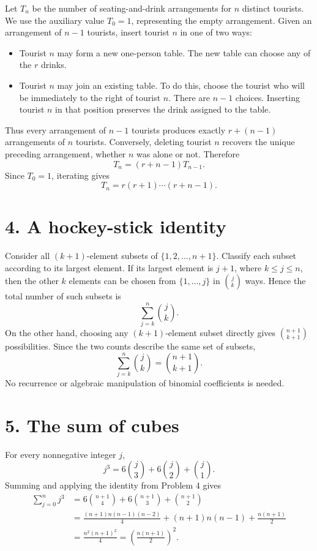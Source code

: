 \documentclass[11pt]{article}
\begin{document}
Let \(T_n\) be the number of seating-and-drink arrangements for \(n\)
distinct tourists. We use the auxiliary value \(T_0=1\), representing the
empty arrangement. Given an arrangement of \(n-1\) tourists, insert tourist
\(n\) in one of two ways:

\begin{itemize}[leftmargin=2em]
    \item Tourist \(n\) may form a new one-person table. The new table can
    choose any of the \(r\) drinks.
    \item Tourist \(n\) may join an existing table. To do this, choose the
    tourist who will be immediately to the right of tourist \(n\). There are
    \(n-1\) choices. Inserting tourist \(n\) in that position preserves the
    drink assigned to the table.
\end{itemize}

Thus every arrangement of \(n-1\) tourists produces exactly
\(r+(n-1)\) arrangements of \(n\) tourists. Conversely, deleting tourist
\(n\) recovers the unique preceding arrangement, whether \(n\) was alone or
not. Therefore
\[
    T_n=(r+n-1)T_{n-1}.
\]
Since \(T_0=1\), iterating gives
\[
    T_n=r(r+1)\cdots(r+n-1).
\]

\section*{4. A hockey-stick identity}

Consider all \((k+1)\)-element subsets of \(\{1,2,\ldots,n+1\}\). Classify
each subset according to its largest element. If its largest element is
\(j+1\), where \(k\leq j\leq n\), then the other \(k\) elements can be chosen
from \(\{1,\ldots,j\}\) in \(\binom{j}{k}\) ways. Hence the total number of
such subsets is
\[
    \sum_{j=k}^{n}\binom{j}{k}.
\]
On the other hand, choosing any \((k+1)\)-element subset directly gives
\(\binom{n+1}{k+1}\) possibilities. Since the two counts describe the same
set of subsets,
\[
    \boxed{\displaystyle \sum_{j=k}^{n}\binom{j}{k}=\binom{n+1}{k+1}}.
\]
No recurrence or algebraic manipulation of binomial coefficients is needed.

\section*{5. The sum of cubes}

For every nonnegative integer \(j\),
\[
    j^3=6\binom{j}{3}+6\binom{j}{2}+\binom{j}{1}.
\]
Summing and applying the identity from Problem 4 gives
\begin{align*}
    \sum_{j=0}^{n}j^3
    &=6\binom{n+1}{4}+6\binom{n+1}{3}+\binom{n+1}{2}\\
    &=\frac{(n+1)n(n-1)(n-2)}{4}
      +(n+1)n(n-1)+\frac{n(n+1)}{2}\\
    &=\boxed{\frac{n^2(n+1)^2}{4}}
      =\boxed{\left(\frac{n(n+1)}{2}\right)^2}.
\end{align*}
\end{document}
